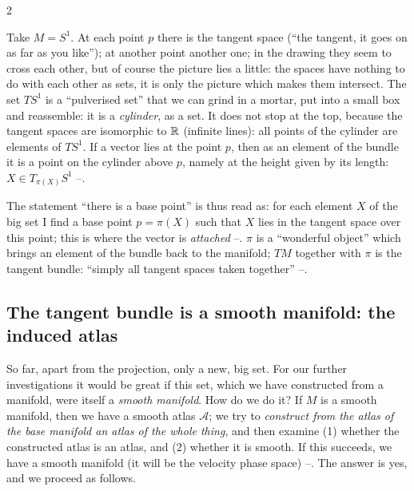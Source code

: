\begin{paracol}{2}
\begin{example}\label{ex:lag-cyl}
Take $M=S^1$. At each point $p$ there is the tangent space (``the tangent, it goes on as far as you like''); at another point another one; in the drawing they seem to cross each other, but of course the picture lies a little: the spaces have nothing to do with each other as sets, it is only the picture which makes them intersect. The set $TS^1$ is a ``pulverised set'' that we can grind in a mortar, put into a small box and reassemble: it is a \emph{cylinder}, as a set.
It does not stop at the top, because the tangent spaces are isomorphic to $\mathbb{R}$ (infinite lines): all points of the cylinder are elements of $TS^1$. If a vector lies at the point $p$, then as an element of the bundle it is a point on the cylinder above $p$, namely at the height given by its length: $X\in T_{\pi(X)}S^1$ --.
\end{example}
The statement ``there is a base point'' is thus read as: for each element $X$ of the big set I find a base point $p=\pi(X)$ such that $X$ lies in the tangent space over this point; this is where the vector is \emph{attached} --. $\pi$ is a ``wonderful object'' which brings an element of the bundle back to the manifold; $TM$ together with $\pi$ is the tangent bundle: ``simply all tangent spaces taken together'' --.

\subsection{The tangent bundle is a smooth manifold: the induced atlas}\label{ssec:lag-atlas}

So far, apart from the projection, only a new, big set. For our further investigations it would be great if this set, which we have constructed from a manifold, were itself a \emph{smooth manifold}. How do we do it? If $M$ is a smooth manifold, then we have a smooth atlas $\mathcal A$; we try to \emph{construct from the atlas of the base manifold an atlas of the whole thing}, and then examine (1) whether the constructed atlas is an atlas, and (2) whether it is smooth. If this succeeds, we have a smooth manifold (it will be the velocity phase space) --. The answer is yes, and we proceed as follows.


\end{paracol}
